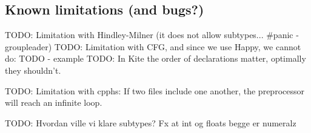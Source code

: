 

\subsection{Known limitations (and bugs?)}
TODO: Limitation with Hindley-Milner (it does not allow subtypes... \#panic - groupleader)
TODO: Limitation with CFG, and since we use Happy, we cannot do: TODO - example
TODO: In Kite the order of declarations matter, optimally they shouldn't.

TODO: Limitation with cpphs: If two files include one another, the preprocessor will reach an infinite loop.


TODO: Hvordan ville vi klare subtypes? Fx at int og floats begge er numeralz
